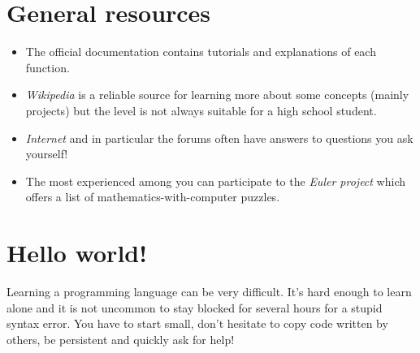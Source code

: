 \documentclass[11pt,class=report,crop=false]{standalone}
\begin{document}


\section*{General resources}

\begin{itemize}

  \item The official \Python{} documentation contains tutorials and explanations of each function. 

  \item \emph{Wikipedia} is a reliable source for learning more about some concepts (mainly projects) but the level is not always suitable for a high school student.
  
  \item \emph{Internet} and in particular the forums often have answers to questions you ask yourself! 
  
  \item The most experienced among you can participate to the \emph{Euler project} which offers a list of mathematics-with-computer puzzles.

\end{itemize}


\section{Hello world!}

Learning a programming language can be very difficult. It's hard enough to learn alone and it is not uncommon to stay blocked for several hours for a stupid syntax error. You have to start small, don't hesitate to copy code written by others, be persistent and quickly ask for help!
\end{document}
